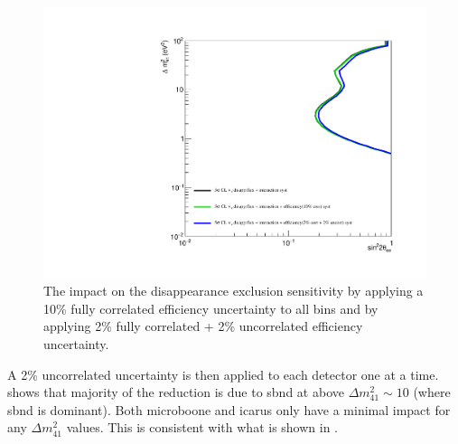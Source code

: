 \begin{figure}[h!]
    \centering
    \includegraphics[width = \largefigwidth]{figures-chap6/exclusion_contours/efficiency_systematics/nue_disapp_cor_uncor.pdf}
    \caption[Impact of correlated and uncorrelated efficiency systematics on the \nue disappearance sensitivity.]{The impact on the \nue disappearance exclusion sensitivity by applying a 10\% fully correlated efficiency uncertainty to all bins and by applying 2\% fully correlated + 2\% uncorrelated efficiency uncertainty.}
    \label{fig:nue_disapp_corr_uncorr}
\end{figure}

A 2\% uncorrelated uncertainty is then applied to each detector one at a time.  shows that majority of the reduction is due to \gls{sbnd} at above $\Delta m_{41}^2 \sim 10$ (where \gls{sbnd} is dominant). Both \gls{microboone} and \gls{icarus} only have a minimal impact for any $\Delta m^2_{41}$ values. This is consistent with what is shown in . 

